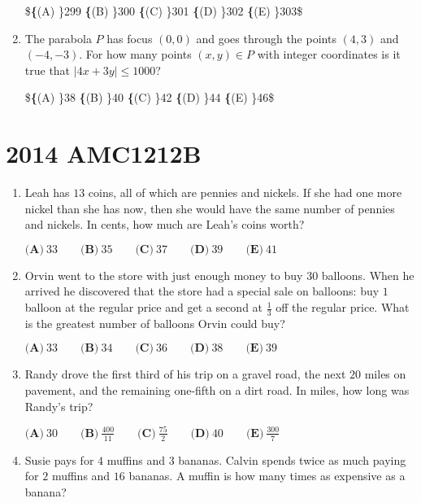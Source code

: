 \documentclass{article}
\begin{document}
\begin{enumerate}[label=\arabic*., itemsep=0.5em]
\$\textbf\{(A) \}299\qquad
\textbf\{(B) \}300\qquad
\textbf\{(C) \}301\qquad
\textbf\{(D) \}302\qquad
\textbf\{(E) \}303\qquad\$\par \vspace{0.5em}\item The parabola $P$ has focus $(0,0)$ and goes through the points $(4,3)$ and $(-4,-3)$.  For how many points $(x,y)\in P$ with integer coordinates is it true that $|4x+3y|\leq 1000$?

\$\textbf\{(A) \}38\qquad
\textbf\{(B) \}40\qquad
\textbf\{(C) \}42\qquad
\textbf\{(D) \}44\qquad
\textbf\{(E) \}46\qquad\$\par \vspace{0.5em}\end{enumerate}\newpage\section*{2014 AMC1212B}\begin{enumerate}[label=\arabic*., itemsep=0.5em]\item Leah has $ 13 $ coins, all of which are pennies and nickels. If she had one more nickel than she has now, then she would have the same number of pennies and nickels. In cents, how much are Leah's coins worth?

$ \textbf{(A)}\ 33\qquad\textbf{(B)}\ 35\qquad\textbf{(C)}\ 37\qquad\textbf{(D)}\ 39\qquad\textbf{(E)}\ 41 $\par \vspace{0.5em}\item Orvin went to the store with just enough money to buy $ 30 $ balloons. When he arrived he discovered that the store had a special sale on balloons: buy $ 1 $ balloon at the regular price and get a second at $ \frac{1}{3} $ off the regular price. What is the greatest number of balloons Orvin could buy?

$ \textbf{(A)}\ 33\qquad\textbf{(B)}\ 34\qquad\textbf{(C)}\ 36\qquad\textbf{(D)}\ 38\qquad\textbf{(E)}\ 39 $\par \vspace{0.5em}\item Randy drove the first third of his trip on a gravel road, the next $ 20 $ miles on pavement, and the remaining one-fifth on a dirt road. In miles, how long was Randy's trip?

$ \textbf{(A)}\ 30\qquad\textbf{(B)}\ \frac{400}{11}\qquad\textbf{(C)}\ \frac{75}{2}\qquad\textbf{(D)}\ 40\qquad\textbf{(E)}\ \frac{300}{7} $\par \vspace{0.5em}\item Susie pays for $ 4 $ muffins and $ 3 $ bananas. Calvin spends twice as much paying for $ 2 $ muffins and $ 16 $ bananas. A muffin is how many times as expensive as a banana?


\end{enumerate}
\end{document}
